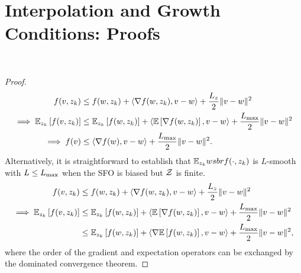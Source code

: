 
\section{Interpolation and Growth Conditions: Proofs}~\label{app:interpolation-gc}

\indSmoothToSmooth*
{}
\begin{proof}
\begin{align*}
    f(v, z_{k}) &\leq f(w, z_{k}) + \left\langle\nabla f(w, z_{k}), v - w\right\rangle + \frac{L_z}{2} \|v - w\|^2\\
    \implies \mathbb{E}_{z_{k}} \left[f(v, z_{k})\right] &\leq \mathbb{E}_{z_{k}} \left[f(w, z_{k})\right] + \left\langle\mathbb{E}\left[\nabla f(w, z_{k})\right], v - w\right\rangle + \frac{L_{\text{max}}}{2} \|v - w\|^2\\
    \implies f(v) &\leq \left\langle\nabla f(w), v - w\right\rangle + \frac{L_{\text{max}}}{2}\|v - w\|^2. 
\end{align*}
Alternatively, it is straightforward to establish that \( \mathbb{E}_{z_{k}} wsbr{f(\cdot, z_{k})} \) is \( L \)-smooth with \( L \leq L_{\text{max}} \) when the SFO is biased but \( \mathcal{Z} \) is finite.
\begin{align*}
    f(v, z_{k}) &\leq f(w, z_{k}) + \left\langle\nabla f(w, z_{k}), v - w\right\rangle + \frac{L_z}{2} \|v - w\|^2\\
    \implies \mathbb{E}_{z_{k}} \left[f(v, z_{k})\right] &\leq \mathbb{E}_{z_{k}} \left[f(w, z_{k})\right] + \left\langle\mathbb{E}\left[\nabla f(w, z_{k})\right], v - w\right\rangle + \frac{L_{\text{max}}}{2} \|v - w\|^2\\
                                 &\leq \mathbb{E}_{z_{k}} \left[f(w, z_{k})\right] + \left\langle\nabla \mathbb{E}\left[f(w, z_{k})\right], v - w\right\rangle + \frac{L_{\text{max}}}{2} \|v - w\|^2,
\end{align*}
where the order of the gradient and expectation operators can be exchanged by the dominated convergence theorem.
\end{proof}

